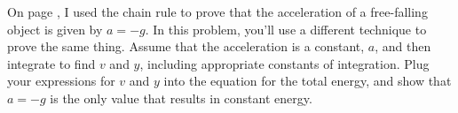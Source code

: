         On page \pageref{gaccelproof}, I used the chain rule to prove that the acceleration
        of a free-falling object is given by $a=-g$. In this problem, you'll use a different
        technique to prove the same thing. Assume that the acceleration is a constant,
        $a$, and then integrate to find $v$ and $y$, including appropriate constants of
        integration. Plug your expressions for $v$ and $y$ into the equation for
        the total energy, and show that $a=-g$ is the only value that results in constant
        energy.
